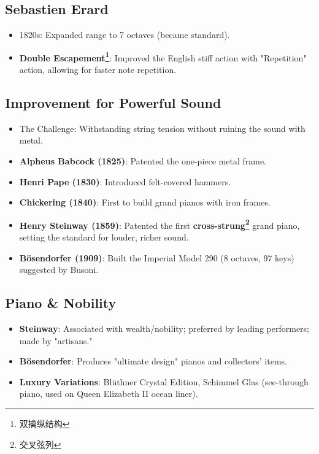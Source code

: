 \documentclass[math,code]{amznotes}
\theoremstyle{remark}
\begin{document}
\subsection{Sebastien Erard}
\begin{itemize}
    \item 1820s: Expanded range to 7 octaves (became standard).
    \item \textbf{Double Escapement\footnote{双擒纵结构}}: Improved the English stiff action with "Repetition" action, allowing for faster note repetition.
\end{itemize}

\subsection{Improvement for Powerful Sound}
\begin{itemize}
    \item The Challenge: Withstanding string tension without ruining the sound with metal.
    \item \textbf{Alpheus Babcock (1825)}: Patented the one-piece metal frame.
    \item \textbf{Henri Pape (1830)}: Introduced felt-covered hammers.
    \item \textbf{Chickering (1840)}: First to build grand pianos with iron frames.
    \item \textbf{Henry Steinway (1859)}: Patented the first \textbf{cross-strung\footnote{交叉弦列}} grand piano, setting the standard for louder, richer sound.
    \item \textbf{Bösendorfer (1909)}: Built the Imperial Model 290 (8 octaves, 97 keys) suggested by Busoni.
\end{itemize}

\subsection{Piano \& Nobility}
\begin{itemize}
    \item \textbf{Steinway}: Associated with wealth/nobility; preferred by leading performers; made by "artisans."
    \item \textbf{Bösendorfer}: Produces "ultimate design" pianos and collectors' items.
    \item \textbf{Luxury Variations}: Blüthner Crystal Edition, Schimmel Glas (see-through piano, used on Queen Elizabeth II ocean liner).
\end{itemize}
\end{document}

